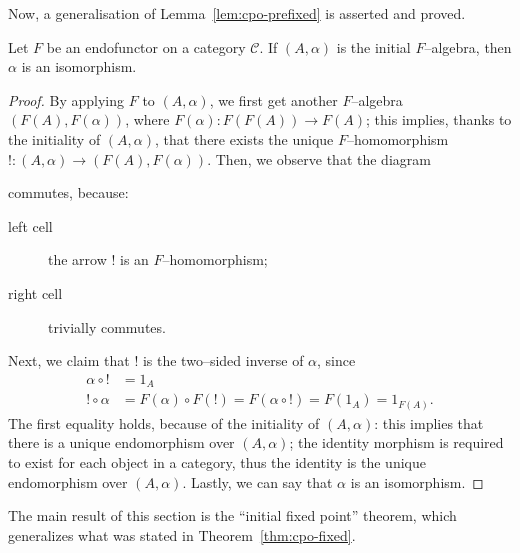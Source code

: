 Now, a generalisation of Lemma~\ref{lem:cpo-prefixed} is asserted and proved.
\begin{lem}
  Let \(F\) be an endofunctor on a category \(\mathcal{C}\).
  If \((A,\alpha)\) is the initial \(F\)--algebra, then \(\alpha{}\) is an isomorphism.
\end{lem}
\begin{proof}
  By applying \(F\) to \((A,\alpha)\), we first get another \(F\)--algebra \((F(A),F(\alpha))\), where \(F(\alpha) \colon F(F(A)) \to F(A)\); this implies, thanks to the initiality of \((A,\alpha)\), that there exists the unique \(F\)--homomorphism \(! \colon (A,\alpha) \to (F(A),F(\alpha))\).
  Then, we observe that the diagram
    \begin{center}
    \end{center}
 commutes, because:
  \begin{description}
    \item[left cell] the arrow \(!{}\) is an \(F\)--homomorphism;
    \item[right cell] trivially commutes.
  \end{description}
  Next, we claim that \(!{}\) is the two--sided inverse of \(\alpha{}\), since %
  \begin{align*}
    \alpha \circ ! &= 1_A \\
    ! \circ \alpha &= F(\alpha) \circ F(!) = F (\alpha \circ !) = F(1_A) = 1_{F(A)}.
  \end{align*}
  The first equality holds, because of the initiality of \((A,\alpha)\): this implies that there is a unique endomorphism over \((A,\alpha)\); the identity morphism is required to exist for each object in a category, thus the identity is the unique endomorphism over \((A,\alpha)\).
  Lastly, we can say that \(\alpha{}\) is an isomorphism.
\end{proof}

The main result of this section is the ``initial fixed point'' theorem, which generalizes what was stated in Theorem~\ref{thm:cpo-fixed}.

